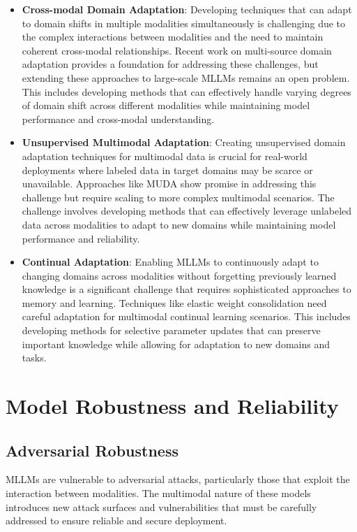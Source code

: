 \begin{itemize}
    \item \textbf{Cross-modal Domain Adaptation}: Developing techniques that can adapt to domain shifts in multiple modalities simultaneously is challenging due to the complex interactions between modalities and the need to maintain coherent cross-modal relationships. Recent work on multi-source domain adaptation \citep{peng2019moment} provides a foundation for addressing these challenges, but extending these approaches to large-scale MLLMs remains an open problem. This includes developing methods that can effectively handle varying degrees of domain shift across different modalities while maintaining model performance and cross-modal understanding.
    
    \item \textbf{Unsupervised Multimodal Adaptation}: Creating unsupervised domain adaptation techniques for multimodal data is crucial for real-world deployments where labeled data in target domains may be scarce or unavailable. Approaches like MUDA show promise in addressing this challenge but require scaling to more complex multimodal scenarios. The challenge involves developing methods that can effectively leverage unlabeled data across modalities to adapt to new domains while maintaining model performance and reliability.
    
    \item \textbf{Continual Adaptation}: Enabling MLLMs to continuously adapt to changing domains across modalities without forgetting previously learned knowledge is a significant challenge that requires sophisticated approaches to memory and learning. Techniques like elastic weight consolidation \citep{kirkpatrick2017overcoming} need careful adaptation for multimodal continual learning scenarios. This includes developing methods for selective parameter updates that can preserve important knowledge while allowing for adaptation to new domains and tasks.
\end{itemize}

\section{Model Robustness and Reliability}

\subsection{Adversarial Robustness}
MLLMs are vulnerable to adversarial attacks, particularly those that exploit the interaction between modalities. The multimodal nature of these models introduces new attack surfaces and vulnerabilities that must be carefully addressed to ensure reliable and secure deployment.

